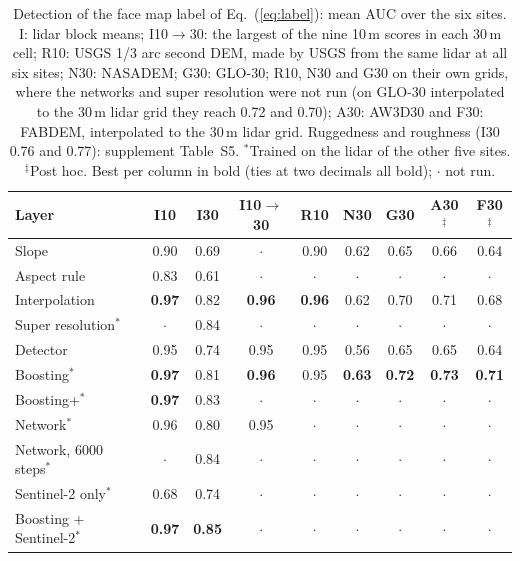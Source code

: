 \documentclass[conference]{IEEEtran}
\begin{document}
\begin{table}[t]
\caption{Detection of the face map label of Eq.~(\ref{eq:label}): mean AUC over the six sites. I: lidar block means; I10$\rightarrow$30: the largest of the nine 10\,m scores in each 30\,m cell; R10: USGS 1/3 arc second DEM, made by USGS from the same lidar at all six sites; N30: NASADEM; G30: GLO-30; R10, N30 and G30 on their own grids, where the networks and super resolution were not run (on GLO-30 interpolated to the 30\,m lidar grid they reach 0.72 and 0.70); A30: AW3D30 and F30: FABDEM, interpolated to the 30\,m lidar grid. Ruggedness and roughness (I30 0.76 and 0.77): supplement Table~S5. $^{*}$Trained on the lidar of the other five sites. $^{\ddagger}$Post hoc. Best per column in bold (ties at two decimals all bold); $\cdot$ not run.}
\label{tab:detection}
\centering\scriptsize
\setlength{\tabcolsep}{2.8pt}
\begin{tabular}{@{}lcccccccc@{}}
\toprule
Layer & I10 & I30 & I10$\rightarrow$30 & R10 & N30 & G30 & A30$^{\ddagger}$ & F30$^{\ddagger}$ \\
\midrule
Slope & 0.90 & 0.69 & $\cdot$ & 0.90 & 0.62 & 0.65 & 0.66 & 0.64 \\
Aspect rule & 0.83 & 0.61 & $\cdot$ & $\cdot$ & $\cdot$ & $\cdot$ & $\cdot$ & $\cdot$ \\
Interpolation & \textbf{0.97} & 0.82 & \textbf{0.96} & \textbf{0.96} & 0.62 & 0.70 & 0.71 & 0.68 \\
Super resolution$^{*}$ & $\cdot$ & 0.84 & $\cdot$ & $\cdot$ & $\cdot$ & $\cdot$ & $\cdot$ & $\cdot$ \\
Detector & 0.95 & 0.74 & 0.95 & 0.95 & 0.56 & 0.65 & 0.65 & 0.64 \\
Boosting$^{*}$ & \textbf{0.97} & 0.81 & \textbf{0.96} & 0.95 & \textbf{0.63} & \textbf{0.72} & \textbf{0.73} & \textbf{0.71} \\
Boosting+$^{*}$ & \textbf{0.97} & 0.83 & $\cdot$ & $\cdot$ & $\cdot$ & $\cdot$ & $\cdot$ & $\cdot$ \\
Network$^{*}$ & 0.96 & 0.80 & 0.95 & $\cdot$ & $\cdot$ & $\cdot$ & $\cdot$ & $\cdot$ \\
Network, 6000 steps$^{*}$ & $\cdot$ & 0.84 & $\cdot$ & $\cdot$ & $\cdot$ & $\cdot$ & $\cdot$ & $\cdot$ \\
Sentinel-2 only$^{*}$ & 0.68 & 0.74 & $\cdot$ & $\cdot$ & $\cdot$ & $\cdot$ & $\cdot$ & $\cdot$ \\
Boosting + Sentinel-2$^{*}$ & \textbf{0.97} & \textbf{0.85} & $\cdot$ & $\cdot$ & $\cdot$ & $\cdot$ & $\cdot$ & $\cdot$ \\

\end{tabular}
\end{table}
\end{document}
